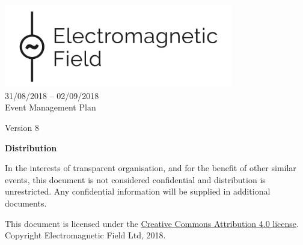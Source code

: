 

\newcommand{\st}{\textsuperscript{st} }
\newcommand{\nd}{\textsuperscript{nd} }
\renewcommand{\th}{\textsuperscript{th} }
\newcommand{\rd}{\textsuperscript{rd} }
\newcommand{\sq}{\textsuperscript{2}}




\begin{titlepage}
\thispagestyle{empty}
\begin{center}
    \includegraphics[width=10cm]{../resources/emf-logo.png}\\[24pt]
    {\LARGE 31/08/2018 -- 02/09/2018} \\[48pt]

    {\Large Event Management Plan}

    Version 8

    \vfill

    \begin{framed}
        \textbf{Distribution}

        In the interests of transparent organisation, and for the benefit of other similar events,
        this document is not considered confidential and distribution is unrestricted.
        Any confidential information will be supplied in additional documents.
        
        \footnotesize{This document is licensed under the
        \href{https://creativecommons.org/licenses/by/4.0/}{Creative Commons Attribution 4.0 license}.
        Copyright Electromagnetic Field Ltd, 2018.}
    \end{framed}


\end{center}
\end{titlepage}
